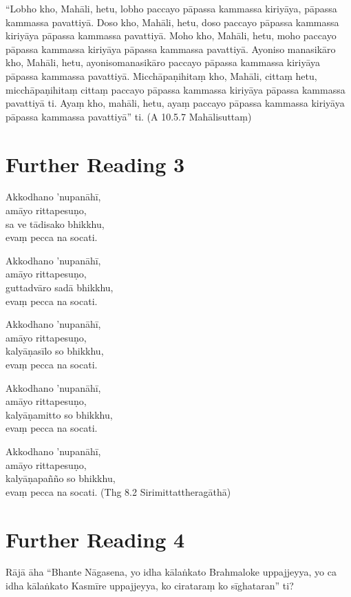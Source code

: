 “Lobho kho, Mahāli, hetu, lobho paccayo pāpassa kammassa kiriyāya, pāpassa kammassa pavattiyā. Doso kho, Mahāli, hetu, doso paccayo pāpassa kammassa kiriyāya pāpassa kammassa pavattiyā. Moho kho, Mahāli, hetu, moho paccayo pāpassa kammassa kiriyāya pāpassa kammassa pavattiyā. Ayoniso manasikāro kho, Mahāli, hetu, ayonisomanasikāro paccayo pāpassa kammassa kiriyāya pāpassa kammassa pavattiyā. Micchāpaṇihitaṃ kho, Mahāli, cittaṃ hetu, micchāpaṇihitaṃ cittaṃ paccayo pāpassa kammassa kiriyāya pāpassa kammassa pavattiyā ti. Ayaṃ kho, mahāli, hetu, ayaṃ paccayo pāpassa kammassa kiriyāya pāpassa kammassa pavattiyā” ti. \hfill(A 10.5.7 Mahālisuttaṃ)

\section*{Further Reading 3}

Akkodhano ’nupanāhī,\\
amāyo rittapesuṇo,\\
sa ve tādisako bhikkhu,\\
evaṃ pecca na socati.

Akkodhano ’nupanāhī,\\
amāyo rittapesuṇo,\\
guttadvāro sadā bhikkhu,\\
evaṃ pecca na socati.

Akkodhano ’nupanāhī,\\
amāyo rittapesuṇo,\\
kalyāṇasīlo so bhikkhu,\\
evaṃ pecca na socati.

Akkodhano ’nupanāhī,\\
amāyo rittapesuṇo,\\
kalyāṇamitto so bhikkhu,\\
evaṃ pecca na socati.

Akkodhano ’nupanāhī,\\
amāyo rittapesuṇo,\\
kalyāṇapañño so bhikkhu,\\
evaṃ pecca na socati. \hfill(Thg 8.2 Sirimittattheragāthā)

\section*{Further Reading 4}

Rājā āha “Bhante Nāgasena, yo idha kālaṅkato Brahmaloke uppajjeyya, yo ca idha kālaṅkato Kasmīre uppajjeyya, ko cirataraṃ ko sīghataran” ti?

